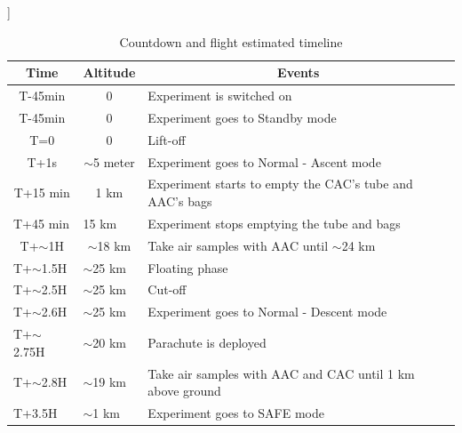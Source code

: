 ]\documentclass[a4paper,12pt,twoside]{article}
\providecommand{\DIFaddend}{} %
\DeclareRobustCommand{\DIFaddend}{\DIFOaddend \let\includegraphics\DIFOincludegraphics} %
\begin{document}
\DIFaddend \begin{table}[H]
\centering


\begin{tabular}{|l|l|l|}
\hline
\multicolumn{1}{|c|}{\textbf{Time}}       & \multicolumn{1}{c|}{\textbf{Altitude}}      & \multicolumn{1}{c|}{\textbf{Events}}                              \\ \hline
\multicolumn{1}{|c|}{T-45min}    & \multicolumn{1}{c|}{0}             & Experiment is switched on                                \\ \hline
\multicolumn{1}{|c|}{T-45min}    & \multicolumn{1}{c|}{0}             & Experiment goes to Standby mode                          \\ \hline
\multicolumn{1}{|c|}{T=0}        & \multicolumn{1}{c|}{0}             & Lift-off                                                 \\ \hline
\multicolumn{1}{|c|}{T+1s}       & \multicolumn{1}{c|}{$\sim$5 meter} & Experiment goes to Normal - Ascent mode                  \\ \hline
\multicolumn{1}{|c|}{T+15 min}   & \multicolumn{1}{c|}{1 km}          & Experiment starts to empty the CAC's tube and AAC's bags \\ \hline
T+45 min                         & 15 km                              & Experiment stops emptying the tube and bags              \\ \hline
\multicolumn{1}{|c|}{T+$\sim$1H} & \multicolumn{1}{c|}{$\sim$18 km}   & Take air samples with AAC until $\sim$24 km                       \\ \hline
T+$\sim$1.5H                     & $\sim$25 km                        & Floating phase                                           \\ \hline
T+$\sim$2.5H                     & $\sim$25 km                        & Cut-off                                                  \\ \hline
T+$\sim$2.6H                     & $\sim$25 km                        & Experiment goes to Normal - Descent mode                 \\ \hline
T+$\sim$2.75H                    & $\sim$20 km                        & Parachute is deployed                                    \\ \hline
T+$\sim$2.8H                     & $\sim$19 km                        & Take air samples with AAC and CAC until 1 km above ground                 \\ \hline
T+3.5H                           & $\sim$1 km                         & Experiment goes to SAFE mode                             \\ \hline
\end{tabular}
\caption{Countdown and flight estimated timeline}
\label{tab:countflight}
\end{table}
\raggedbottom
\pagebreak
\end{document}
